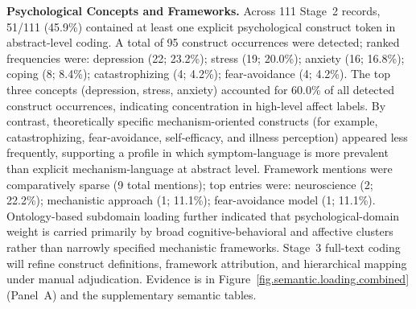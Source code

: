\par\medskip
\noindent\textbf{Psychological Concepts and Frameworks.} Across 111 Stage~2 records, 51/111 (45.9\%) contained at least one explicit psychological construct token in abstract-level coding. A total of 95 construct occurrences were detected; ranked frequencies were: depression (22; 23.2\%); stress (19; 20.0\%); anxiety (16; 16.8\%); coping (8; 8.4\%); catastrophizing (4; 4.2\%); fear-avoidance (4; 4.2\%). The top three concepts (depression, stress, anxiety) accounted for 60.0\% of all detected construct occurrences, indicating concentration in high-level affect labels. By contrast, theoretically specific mechanism-oriented constructs (for example, catastrophizing, fear-avoidance, self-efficacy, and illness perception) appeared less frequently, supporting a profile in which symptom-language is more prevalent than explicit mechanism-language at abstract level. Framework mentions were comparatively sparse (9 total mentions); top entries were: neuroscience (2; 22.2\%); mechanistic approach (1; 11.1\%); fear-avoidance model (1; 11.1\%). Ontology-based subdomain loading further indicated that psychological-domain weight is carried primarily by broad cognitive-behavioral and affective clusters rather than narrowly specified mechanistic frameworks. Stage~3 full-text coding will refine construct definitions, framework attribution, and hierarchical mapping under manual adjudication. Evidence is in Figure~\ref{fig.semantic.loading.combined} (Panel~A) and the supplementary semantic tables.
